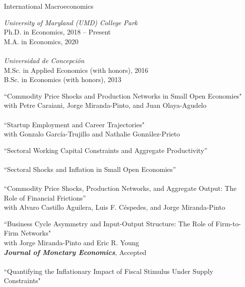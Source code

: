 \documentclass[10pt]{article}
\begin{document}
\begin{description}[leftmargin=10em,style=nextline]
    \item[Research Interests] International Macroeconomics
    \item[Education] {\itshape University of Maryland (UMD) College Park}\\
    Ph.D. in Economics, 2018 --  Present\\
    M.A. in Economics, 2020\\ 
    \\[-0.1in]
{\itshape Universidad de Concepci\'on}\\
M.Sc. in Applied Economics (with honors), 2016 \\
B.Sc. in Economics (with honors), 2013\\[-.1in]
    \item[Working Papers] ``Commodity Price Shocks and Production Networks in Small Open Economies"\\
     with Petre Caraiani, Jorge Miranda-Pinto, and Juan Olaya-Agudelo\\
    \\[-0.1in]
      ``Startup Employment and Career Trajectories"\\
     with Gonzalo Garc\'ia-Trujillo and Nathalie Gonz\'alez-Prieto\\
     \item[Work in Progress] ``Sectoral Working Capital Constraints and Aggregate Productivity''\\ \\[-0.1in]
     ``Sectoral Shocks and Inflation in Small Open Economies''\\
     \\[-0.1in]
     ``Commodity Price Shocks, Production Networks, and Aggregate Output: The Role of Financial Frictions''\\
      with Alvaro Castillo Aguilera, Luis F. C\'espedes, and Jorge Miranda-Pinto\\[-.1in]
     \item[Published Papers ] ``Business Cycle Asymmetry and Input-Output Structure: The Role of Firm-to-Firm Networks"\\
     with Jorge Miranda-Pinto and Eric R. Young\\
     \textbf{\textit{Journal of Monetary Economics}}, Accepted\\
     \\[-0.1in]
     ``Quantifying the Inflationary Impact of Fiscal Stimulus Under Supply Constraints"\\

\end{description}
\end{document}
